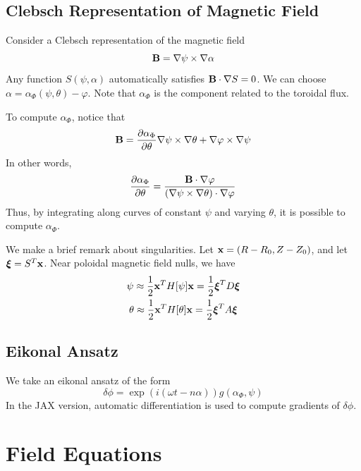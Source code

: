\documentclass[]{article}
\begin{document}
\subsection{Clebsch Representation of Magnetic Field}

Consider a Clebsch representation of the magnetic field
\begin{equation*}
	\vb{B} = \nabla \psi \times \nabla \alpha
\end{equation*}
Any function \(S(\psi,\alpha)\) automatically satisfies \(\vb{B} \cdot \nabla S = 0\).
We can choose \(\alpha = \alpha_\Phi(\psi,\theta) - \varphi\).
Note that \(\alpha_\Phi\) is the component related to the toroidal flux.

To compute \(\alpha_\Phi\), notice that
\begin{equation*}
	\vb{B} = \pdv{\alpha_\Phi}{\theta} \nabla \psi \times \nabla \theta + \nabla \varphi \times \nabla \psi
\end{equation*}
In other words,
\begin{equation*}
	\pdv{\alpha_\Phi}{\theta} = \frac{\vb{B} \cdot \nabla \varphi}{(\nabla \psi \times \nabla \theta) \cdot \nabla \varphi}
\end{equation*}
Thus, by integrating along curves of constant \(\psi\) and varying \(\theta\), it is possible to compute \(\alpha_\Phi\).

We make a brief remark about singularities.
Let \(\vb{x} = (R-R_0, Z-Z_0)\), and let \(\vb*{\xi} = S^T \vb{x}\).
Near poloidal magnetic field nulls, we have
\begin{gather*}
	\psi \approx \frac{1}{2} \vb{x}^T H[\psi] \vb{x} = \frac{1}{2} \vb*{\xi}^T D \vb*{\xi} \\
	\theta \approx \frac{1}{2} \vb{x}^T H[\theta] \vb{x} = \frac{1}{2} \vb*{\xi}^T A \vb*{\xi}
\end{gather*}

\subsection{Eikonal Ansatz}

We take an eikonal ansatz of the form
\begin{equation}
	\delta \phi = \exp(i(\omega t - n \alpha)) g(\alpha_\Phi, \psi)
\end{equation}
In the JAX version, automatic differentiation is used to compute gradients of \(\delta \phi\).



\section{Field Equations}
\end{document}
